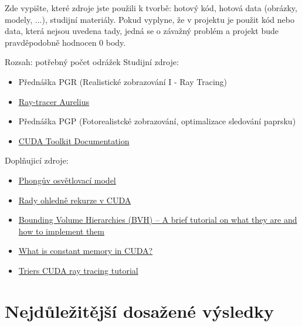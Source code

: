 \documentclass[12pt,a4paper,titlepage,final]{report}
\begin{document}
Zde vypište, které zdroje jste použili k tvorbě: hotový kód, hotová data
(obrázky, modely, $\ldots$), studijní materiály. Pokud vyplyne, že v projektu
je použit kód nebo data, která nejsou uvedena tady, jedná se o závažný problém
a projekt bude pravděpodobně hodnocen 0 body.

Rozsah: potřebný počet odrážek
Studijní zdroje:
\begin{itemize}
\item Přednáška PGR (Realistické zobrazování I - Ray Tracing)
\item \href{https://www.fit.vutbr.cz/study/courses/PGR/private/Aurelius.zip}{Ray-tracer Aurelius}
\item Přednáška PGP (Fotorealistcké zobrazování, optimalizace sledování paprsku)
\item \href{http://docs.nvidia.com/cuda}{CUDA Toolkit Documentation}
\end{itemize}
Doplňujicí zdroje:
\begin{itemize}
\item \href{http://cs.wikipedia.org/wiki/Phong%C5%AFv_osv%C4%9Btlovac%C3%AD_model}{Phongův osvětlovací model}
\item \href{http://stackoverflow.com/questions/19013156/how-does-cuda-4-0-support-recursion}{Rady ohledně rekurze v CUDA}
\item \href{http://www.3dmuve.com/3dmblog/?p=182}{Bounding Volume Hierarchies (BVH) – A brief tutorial on what they are and how to implement them}
\item \href{http://cuda-programming.blogspot.cz/2013/01/what-is-constant-memory-in-cuda.html}{What is constant memory in CUDA?}
\item \href{http://cg.alexandra.dk/2009/08/10/triers-cuda-ray-tracing-tutorial/}{Triers CUDA ray tracing tutorial}
\end{itemize}
\section{Nejdůležitější dosažené výsledky}
\end{document}
